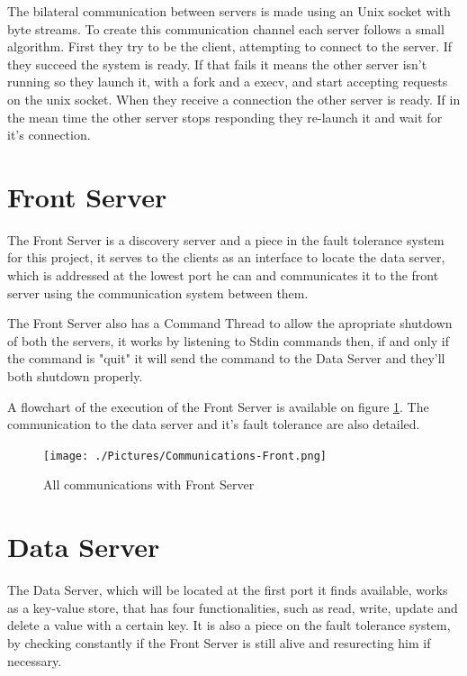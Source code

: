 \documentclass[12pt]{article} %
\begin{document}
The bilateral communication between servers is made using an Unix socket with
byte streams. To create this communication channel each server follows a small
algorithm. First they try to be the client, attempting to connect to the server.
If they succeed the system is ready. If that fails it means the other server isn't
running so they launch it, with a fork and a execv, and start accepting requests
on the unix socket. When they receive a connection the other server is ready. If
in the mean time the other server stops responding they re-launch it and wait for
it's connection.

\section{Front Server}
\label{sec:FrontServer}

The Front Server is a discovery server and a piece in the fault tolerance system for this project,
it serves to the clients as an interface to locate the data server, which is addressed at the lowest port he can
and communicates it to the front server using the communication system between them.

The Front Server also has a Command Thread to allow the apropriate shutdown of both the servers,
it works by listening to Stdin commands then, if and only if the command is "quit" it will send the command
to the Data Server and they'll both shutdown properly.

A flowchart of the execution of the Front Server is available on figure \ref{fig:CommunicationsFront}.
The communication to the data server and it's fault tolerance are also detailed.

\begin{figure}[ht]
\centering
\texttt{[image: ./Pictures/Communications-Front.png]}
\caption{All communications with Front Server}\label{fig:CommunicationsFront}
\end{figure}

\section{Data Server}
\label{sec:DataServer}

The Data Server, which will be located at the first port it finds available,
works as a key-value store, that has four functionalities, such as read,
write, update and delete a value with a certain key. It is also a piece on the fault tolerance system,
by checking constantly if the Front Server is still alive and resurecting him if necessary.
\end{document}

